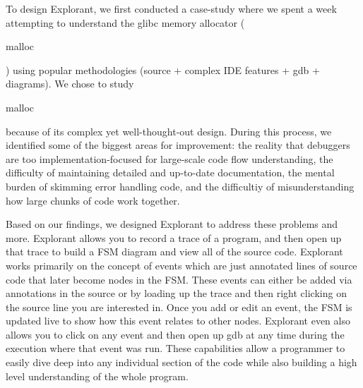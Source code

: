 To design Explorant, we first conducted a case-study where we spent a week attempting to understand the glibc memory allocator (\begin{tt}malloc\end{tt}) using popular methodologies (source + complex IDE features + gdb + diagrams). We chose to study \begin{tt}malloc\end{tt} because of its complex yet well-thought-out design. During this process, we identified some of the biggest areas for improvement: the reality that debuggers are too implementation-focused for large-scale code flow understanding, the difficulty of maintaining detailed and up-to-date documentation, the mental burden of skimming error handling code, and the difficultiy of misunderstanding how large chunks of code work together. 

Based on our findings, we designed Explorant to address these problems and more. Explorant allows you to record a trace of a program, and then open up that trace to build a FSM diagram and view all of the source code. Explorant works primarily on the concept of events which are just annotated lines of source code that later become nodes in the FSM. These events can either be added via annotations in the source or by loading up the trace and then right clicking on the source line you are interested in. Once you add or edit an event, the FSM is updated live to show how this event relates to other nodes. Explorant even also allows you to click on any event and then open up gdb at any time during the execution where that event was run. These capabilities allow a programmer to easily dive deep into any individual section of the code while also building a high level understanding of the whole program.


